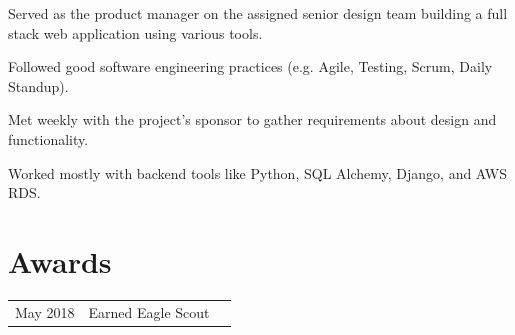 \documentclass[]{latex/resume}
\begin{document}
\begin{minipage}[t]{0.75\textwidth}
     
    \begin{tightemize}
        \item Served as the product manager on the assigned senior design team building a full stack web application using various tools.
        \item Followed good software engineering practices (e.g. Agile, Testing, Scrum, Daily Standup).
        \item Met weekly with the project's sponsor to gather requirements about design and functionality.
        \item Worked mostly with backend tools like Python, SQL Alchemy, Django, and AWS RDS.
    \end{tightemize}

    \sectionsep




\section{Awards} 
    \begin{tabular}{rll}
        May 2018 & Earned Eagle Scout \\
    \end{tabular}
    \sectionsep
%
%   

\end{minipage} 
\hfill
\end{document}
